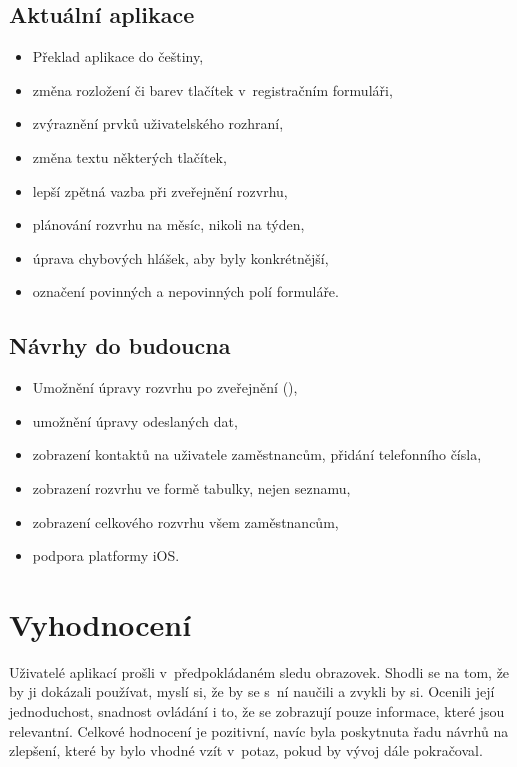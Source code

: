 \documentclass[twoside]{ctuthesis}
\begin{document}
\subsection{Aktuální aplikace}
\begin{itemize}
	\item Překlad aplikace do češtiny,
	\item změna rozložení či barev tlačítek v~registračním formuláři,
	\item zvýraznění prvků uživatelského rozhraní,
	\item změna textu některých tlačítek,
	\item lepší zpětná vazba při zveřejnění rozvrhu,
	\item plánování rozvrhu na měsíc, nikoli na týden,
	\item úprava chybových hlášek, aby byly konkrétnější,
	\item označení povinných a nepovinných polí formuláře.
\end{itemize}

\subsection{Návrhy do budoucna}
\begin{itemize}
	\item Umožnění úpravy rozvrhu po zveřejnění (\textit{}),
	\item umožnění úpravy odeslaných dat,
	\item zobrazení kontaktů na uživatele zaměstnancům, přidání telefonního čísla,
	\item zobrazení rozvrhu ve formě tabulky, nejen seznamu,
	\item zobrazení celkového rozvrhu všem zaměstnancům,
	\item podpora platformy iOS.
\end{itemize}


\section{Vyhodnocení}
Uživatelé aplikací prošli v~předpokládaném sledu obrazovek. Shodli se na tom, že by ji dokázali používat, myslí si, že by se s~ní naučili a zvykli by si. Ocenili její jednoduchost, snadnost ovládání i to, že se zobrazují pouze informace, které jsou relevantní. Celkové hodnocení je pozitivní, navíc byla poskytnuta řadu návrhů na zlepšení, které by bylo vhodné vzít v~potaz, pokud by vývoj dále pokračoval.
\end{document}
